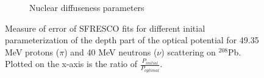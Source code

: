 \begin{figure}[h]
\begin{subfigure}{0.5\textwidth}
		\caption{Nuclear diffuseness parameters  }
		\label{fig:pna}
        \end{subfigure}
        \caption{Measure of error of SFRESCO fits for different initial parameterization of the depth part of the optical potential for 49.35 MeV protons ($\pi$) and 40 MeV neutrons ($\nu$) scattering on $^{208}$Pb. Plotted on the x-axis is the ratio of $\frac{P_{initial}}{P_{optimal}}$. }
        \label{fig:initializations}
	\end{figure}
